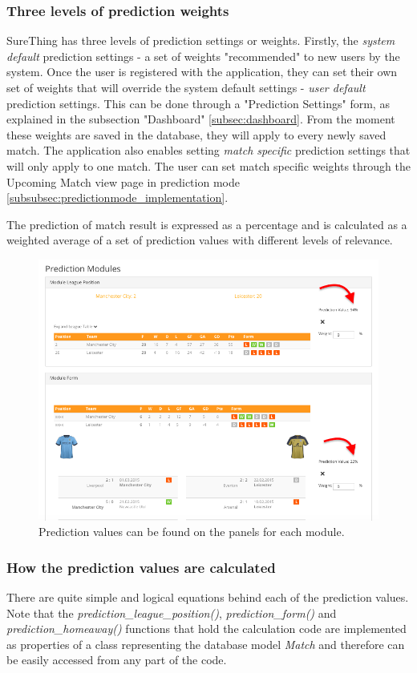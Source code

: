 \subsubsection*{Three levels of prediction weights}
SureThing has three levels of prediction settings or weights. Firstly, the \emph{system default} prediction settings - a set of weights "recommended" to new users by the system. Once the user is registered with the application, they can set their own set of weights that will override the system default settings - \emph{user default} prediction settings. This can be done through a "Prediction Settings" form, as explained in the subsection "Dashboard" \ref{subsec:dashboard}. From the moment these weights are saved in the database, they will apply to every newly saved match. The application also enables setting \emph {match specific} prediction settings that will only apply to one match. The user can set match specific weights through the Upcoming Match view page in prediction mode \ref{subsubsec:predictionmode_implementation}.

The prediction of match result is expressed as a percentage and is calculated as a weighted average of a set of prediction values with different levels of relevance.

\begin{figure}[H]
	\begin{center}
		\includegraphics[width=.80\textwidth]{impl/images/predictionValues}
		\caption{Prediction values can be found on the panels for each module.} \label{fig:using: predictionvalues}
	\end{center}
\end{figure}

\subsubsection*{How the prediction values are calculated}
There are quite simple and logical equations behind each of the prediction values. Note that the \emph{prediction\_league\_position()}, \emph{prediction\_form()} and \emph{prediction\_homeaway()} functions that hold the calculation code are implemented as properties of a class representing the database model \emph{Match} and therefore can be easily accessed from any part of the code.

